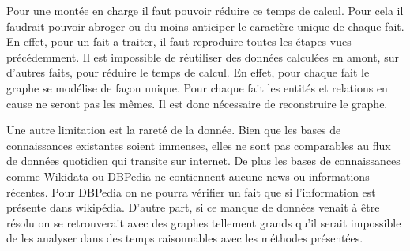 Pour une montée en charge il faut pouvoir réduire ce temps de calcul. Pour cela il faudrait pouvoir abroger ou du moins anticiper le caractère unique de chaque fait. En effet, pour un fait a traiter, il faut reproduire toutes les étapes vues précédemment. Il est impossible de réutiliser des données calculées en amont, sur d'autres faits, pour réduire le temps de calcul. En effet, pour chaque fait le graphe se modélise de façon unique. Pour chaque fait les entités et relations en cause ne seront pas les mêmes. Il est donc nécessaire de reconstruire le graphe.

Une autre limitation est la rareté de la donnée. Bien que les bases de connaissances existantes soient immenses, elles ne sont pas comparables au flux de données quotidien qui transite sur internet. De plus les bases de connaissances comme Wikidata ou DBPedia ne contiennent aucune news ou informations récentes. Pour DBPedia on ne pourra vérifier un fait que si l'information est présente dans wikipédia. D'autre part, si ce manque de données venait à être résolu on se retrouverait avec des graphes tellement grands qu'il serait impossible de les analyser dans des temps raisonnables avec les méthodes présentées.
